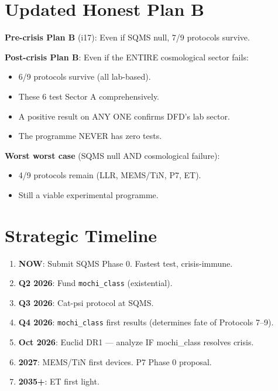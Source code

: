 \documentclass[11pt]{article}
\begin{document}
\section{Updated Honest Plan B}

\textbf{Pre-crisis Plan B} (i17): Even if SQMS null, 7/9 protocols survive.

\textbf{Post-crisis Plan B}: Even if the ENTIRE cosmological sector fails:
\begin{itemize}
\item 6/9 protocols survive (all lab-based).
\item These 6 test Sector A comprehensively.
\item A positive result on ANY ONE confirms DFD's lab sector.
\item The programme NEVER has zero tests.
\end{itemize}

\textbf{Worst worst case} (SQMS null AND cosmological failure):
\begin{itemize}
\item 4/9 protocols remain (LLR, MEMS/TiN, P7, ET).
\item Still a viable experimental programme.
\end{itemize}

\section{Strategic Timeline}

\begin{enumerate}
\item \textbf{NOW}: Submit SQMS Phase 0. Fastest test, crisis-immune.
\item \textbf{Q2 2026}: Fund \texttt{mochi\_class} (existential).
\item \textbf{Q3 2026}: Cat-psi protocol at SQMS.
\item \textbf{Q4 2026}: \texttt{mochi\_class} first results (determines
  fate of Protocols 7--9).
\item \textbf{Oct 2026}: Euclid DR1 --- analyze IF mochi\_class resolves
  crisis.
\item \textbf{2027}: MEMS/TiN first devices. P7 Phase 0 proposal.
\item \textbf{2035+}: ET first light.
\end{enumerate}
\end{document}
